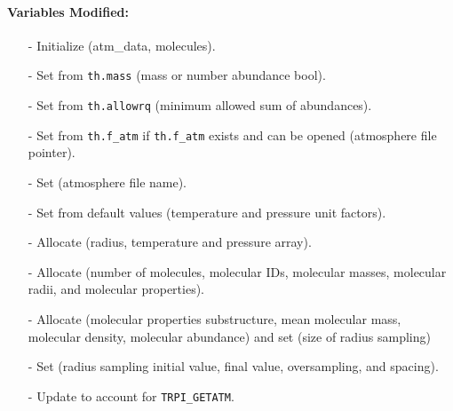 \documentclass[letterpaper,12pt]{article}
\begin{document}
\paragraph{Variables Modified:}
\begin{enumerate}[leftmargin=10pt, noitemsep, parsep=0pt, topsep=0ex]
\item[-] Initialize   (atm\_data, molecules).
\item[-] Set  from {\tt th.mass} (mass or
  number abundance bool).
\item[-] Set  from {\tt th.allowrq} (minimum
  allowed sum of abundances).
\item[-] Set  from {\tt th.f\_atm} if {\tt th.f\_atm} exists and can be
  opened (atmosphere file pointer).
\item[-] Set  (atmosphere file name).
\item[-] Set  from
  default values (temperature and pressure unit factors).
\item[-] Allocate  (radius, temperature and pressure array).
\item[-] Allocate  (number of molecules, molecular IDs, molecular masses, molecular radii, and molecular properties).
\item[-] Allocate  (molecular properties substructure, mean molecular mass, molecular density, molecular abundance) and set  (size of radius sampling)
\item[-] Set  (radius sampling initial value, final value,
  oversampling, and spacing).
 \item[-] Update  to account for {\tt TRPI\_GETATM}.
\end{enumerate}
\end{document}
